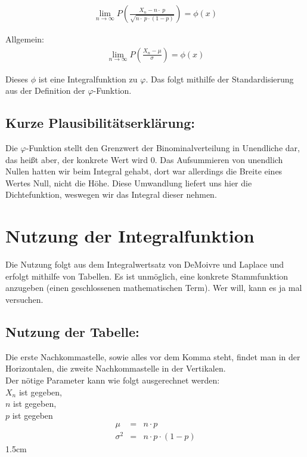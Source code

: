 \documentclass[12pt,a4paper,twocolumn]{article}
\begin{document}
\begin{eqnarray}
\lim\limits_{n \rightarrow \infty} P \left(\frac{X_n - n\cdot\ p}{\sqrt{n\cdot\ p\cdot(1 - p)}}\right) = \phi(x)
\end{eqnarray}

Allgemein:
\begin{eqnarray}
\lim\limits_{n \rightarrow \infty} P \left(\frac{X_n - \mu}{\sigma}\right) = \phi(x)
\end{eqnarray}

Dieses $\phi$ ist eine Integralfunktion zu $\varphi$. Das folgt mithilfe der Standardisierung aus der Definition der $\varphi$-Funktion. 

\subsection{Kurze Plausibilitätserklärung:}

Die $\varphi$-Funktion stellt den Grenzwert der Binominalverteilung in Unendliche dar, das heißt aber, der konkrete Wert wird 0. Das Aufsummieren von unendlich Nullen hatten wir beim Integral gehabt, dort war allerdings die Breite eines Wertes Null, nicht die \glqq Höhe\grqq. Diese Umwandlung liefert uns hier die Dichtefunktion, weswegen wir das Integral dieser nehmen.

\section{Nutzung der Integralfunktion}
Die Nutzung folgt aus dem Integralwertsatz von DeMoivre und Laplace und erfolgt mithilfe von Tabellen. Es ist unmöglich, eine konkrete Stammfunktion anzugeben (einen geschlossenen mathematischen Term). Wer will, kann es ja mal versuchen.
\subsection{Nutzung der Tabelle:}

Die erste Nachkommastelle, sowie alles vor dem Komma steht, findet man in der Horizontalen, die zweite Nachkommastelle in der Vertikalen. 
\\
Der nötige Parameter kann wie folgt ausgerechnet werden:\\
{\center $X_n$ ist gegeben,\\
$n$ ist gegeben,\\
$p$ ist gegeben\\}
\begin{eqnarray}
\mu &=& n \cdot p \\
\sigma^2 &=& n \cdot p \cdot (1 - p)
\end{eqnarray}
\setlength{\fboxsep} {1.5cm}
\end{document}
